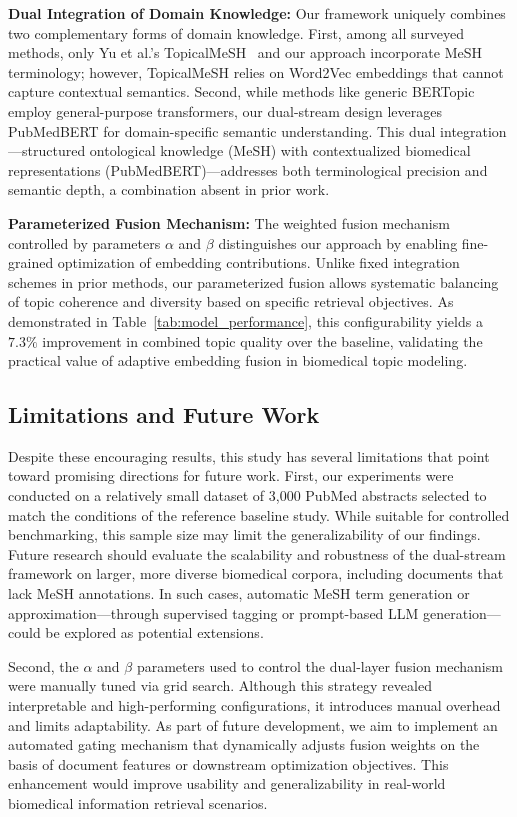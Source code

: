 \documentclass[authorproof,JACIII,researchpaper]{fujipressarticle}
\begin{document}
\textbf{Dual Integration of Domain Knowledge:} Our framework uniquely combines two complementary forms of domain knowledge. First, among all surveyed methods, only Yu et al.'s TopicalMeSH~\cite{yu_improving_2016} and our approach incorporate MeSH terminology; however, TopicalMeSH relies on Word2Vec embeddings that cannot capture contextual semantics. Second, while methods like generic BERTopic~\cite{grootendorst_bertopic_2022} employ general-purpose transformers, our dual-stream design leverages PubMedBERT for domain-specific semantic understanding. This dual integration---structured ontological knowledge (MeSH) with contextualized biomedical representations (PubMedBERT)---addresses both terminological precision and semantic depth, a combination absent in prior work.

\textbf{Parameterized Fusion Mechanism:} The weighted fusion mechanism controlled by parameters $\alpha$ and $\beta$ distinguishes our approach by enabling fine-grained optimization of embedding contributions. Unlike fixed integration schemes in prior methods, our parameterized fusion allows systematic balancing of topic coherence and diversity based on specific retrieval objectives. As demonstrated in Table~\ref{tab:model_performance}, this configurability yields a $7.3\%$ improvement in combined topic quality over the baseline, validating the practical value of adaptive embedding fusion in biomedical topic modeling.

\subsection{Limitations and Future Work}

Despite these encouraging results, this study has several limitations that point toward promising directions for future work. First, our experiments were conducted on a relatively small dataset of 3,000 PubMed abstracts selected to match the conditions of the reference baseline study. While suitable for controlled benchmarking, this sample size may limit the generalizability of our findings. Future research should evaluate the scalability and robustness of the dual-stream framework on larger, more diverse biomedical corpora, including documents that lack MeSH annotations. In such cases, automatic MeSH term generation or approximation---through supervised tagging or prompt-based LLM generation---could be explored as potential extensions.

Second, the $\alpha$ and $\beta$ parameters used to control the dual-layer fusion mechanism were manually tuned via grid search. Although this strategy revealed interpretable and high-performing configurations, it introduces manual overhead and limits adaptability. As part of future development, we aim to implement an automated gating mechanism that dynamically adjusts fusion weights on the basis of document features or downstream optimization objectives. This enhancement would improve usability and generalizability in real-world biomedical information retrieval scenarios.
\end{document}
